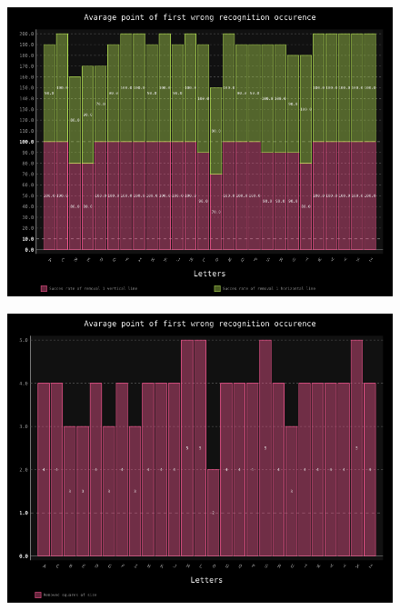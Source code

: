\documentclass[a4paper]{article}
\begin{document}
\begin{figure}[h!]
	\centering
	\includegraphics[scale=0.7,keepaspectratio=true]{Charts/Removed_linesTestPlanResultsChart_ClasifierTester.png}	
	\caption{}
	\label{lines_clas}
\end{figure}

\begin{figure}[h!]
	\centering
	\includegraphics[scale=0.7,keepaspectratio=true]{Charts/SquaresTestPlanResultsChart_NormalTester.png}	
	\caption{}
	\label{squares_trans}
\end{figure}
\end{document}
